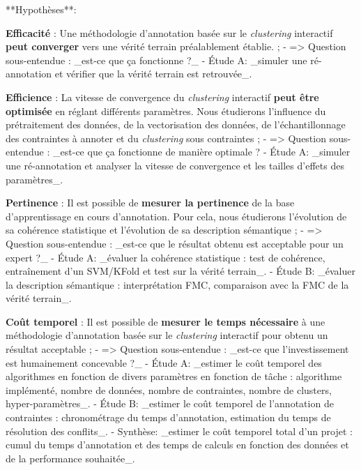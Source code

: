 **Hypothèses**:

\item \textbf{Efficacité} : Une méthodologie d'annotation basée sur le \textit{clustering} interactif \textbf{peut converger} vers une vérité terrain préalablement établie. ;
    - => Question sous-entendue : _est-ce que ça fonctionne ?_
	- Étude A: _simuler une ré-annotation et vérifier que la vérité terrain est retrouvée_.

\item \textbf{Efficience} : La vitesse de convergence du \textit{clustering} interactif \textbf{peut être optimisée} en réglant différents paramètres. Nous étudierons l'influence du prétraitement des données, de la vectorisation des données, de l'échantillonnage des contraintes à annoter et du \textit{clustering} sous contraintes ;
    - => Question sous-entendue : _est-ce que ça fonctionne de manière optimale ?
	- Étude A: _simuler une ré-annotation et analyser la vitesse de convergence et les tailles d'effets des paramètres_.

\item \textbf{Pertinence} : Il est possible de \textbf{mesurer la pertinence} de la base d'apprentissage en cours d'annotation. Pour cela, nous étudierons l'évolution de sa cohérence statistique et l'évolution de sa description sémantique ;
    - => Question sous-entendue : _est-ce que le résultat obtenu est acceptable pour un expert ?_
	- Étude A: _évaluer la cohérence statistique : test de cohérence, entraînement d'un SVM/KFold et test sur la vérité terrain_.
	- Étude B: _évaluer la description sémantique : interprétation FMC, comparaison avec la FMC de la vérité terrain_.

\item \textbf{Coût temporel} : Il est possible de \textbf{mesurer le temps nécessaire} à une méthodologie d'annotation basée sur le \textit{clustering} interactif pour obtenu un résultat acceptable ;
	- => Question sous-entendue : _est-ce que l'investissement est humainement concevable ?_
	- Étude A: _estimer le coût temporel des algorithmes en fonction de divers paramètres en fonction de tâche : algorithme implémenté, nombre de données, nombre de contraintes, nombre de clusters, hyper-paramètres_.
	- Étude B: _estimer le coût temporel de l'annotation de contraintes : chronométrage du temps d'annotation, estimation du temps de résolution des conflits_.
	- Synthèse: _estimer le coût temporel total d'un projet : cumul du temps d'annotation et des temps de calculs en fonction des données et de la performance souhaitée_.
	
